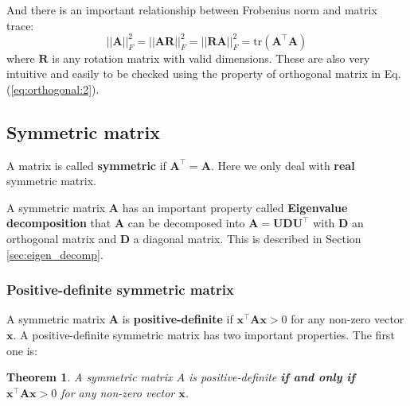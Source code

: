 \documentclass[12pt]{article}
\newtheorem{theorem}{Theorem}[section]
\numberwithin{equation}{section}
\begin{document}
And there is an important relationship between Frobenius norm and matrix trace:
\begin{equation}
||\mathbf{A}||_F^2 = ||\mathbf{AR}||_F^2 =||\mathbf{RA}||_F^2 = \text{tr}(\mathbf{A^\top A})
\label{eq:trace}
\end{equation}
where $\mathbf{R}$ is any rotation matrix with valid dimensions. These are also very intuitive and easily to be checked using the property of orthogonal matrix in Eq. (\ref{eq:orthogonal:2}).

\subsection{Symmetric matrix}

A matrix is called \textbf{symmetric} if $\mathbf{A}^\top = \mathbf{A}$. Here we only deal with \textbf{real} symmetric matrix. 

A symmetric matrix $\mathbf{A}$ has an important property called \textbf{Eigenvalue decomposition} that $\mathbf{A}$ can be decomposed into $\mathbf{A = UDU^\top}$ with $\mathbf{D}$ an orthogonal matrix and $\mathbf{D}$ a diagonal matrix. This is described in Section \ref{sec:eigen_decomp}.

\subsubsection{Positive-definite symmetric matrix}

A symmetric matrix $\mathbf{A}$ is \textbf{positive-definite} if $\mathbf{x}^\top \mathbf{A}\mathbf{x} > 0$ for any non-zero vector $\mathbf{x}$. A positive-definite symmetric matrix has two important properties. The first one is: \newline

\begin{theorem}
A symmetric matrix $A$ is positive-definite \textbf{if and only if} $\mathbf{x}^\top \mathbf{A}\mathbf{x} > 0$ for any non-zero vector $\mathbf{x}$.
\end{theorem}
\end{document}

